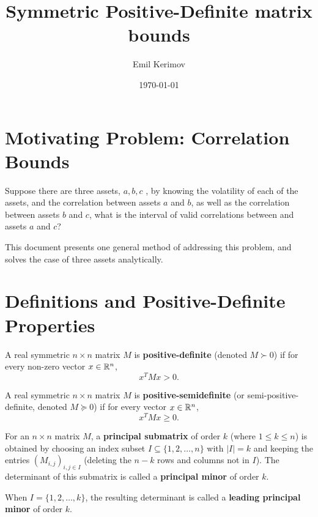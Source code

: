\documentclass[a4paper]{article}
\title{Symmetric Positive-Definite matrix bounds}
\author{Emil Kerimov}
\date{\today}
\begin{document}
\maketitle



\section{Motivating Problem: Correlation Bounds}
Suppose there are three assets, $a,b,c$ , by knowing the volatility of each of the assets, and the correlation between assets $a$ and $b$, as well as the correlation between assets $b$ and $c$, what is the interval of valid correlations between and assets $a$ and $c$?

This document presents one general method of addressing this problem, and solves the case of three assets analytically.

\section{Definitions and Positive-Definite Properties}

\begin{definition}\label{spd:PD}
A real symmetric $n \times n$ matrix $M$ is \textbf{positive-definite} (denoted $M \succ 0$) if for every non-zero vector $x \in \mathbb{R}^n$,
\begin{equation}
x^T M x > 0.
\end{equation}
\end{definition}

\begin{definition}\label{spd:PSD}
A real symmetric $n \times n$ matrix $M$ is \textbf{positive-semidefinite} (or semi-positive-definite, denoted $M \succeq 0$) if for every vector $x \in \mathbb{R}^n$,
\begin{equation}
x^T M x \geq 0.
\end{equation}
\end{definition}

\begin{definition}\label{spd:principle minor}
For an $n \times n$ matrix $M$, a \textbf{principal submatrix} of order $k$ (where $1 \leq k \leq n$) is obtained by choosing an index subset $I \subseteq \{1, 2, \dots, n\}$ with $|I| = k$ and keeping the entries $(M_{i,j})_{i,j \in I}$ (deleting the $n-k$ rows and columns not in $I$). The determinant of this submatrix is called a \textbf{principal minor} of order $k$.

When $I = \{1, 2, \dots, k\}$, the resulting determinant is called a \textbf{leading principal minor} of order $k$.
\end{definition}
\end{document}
